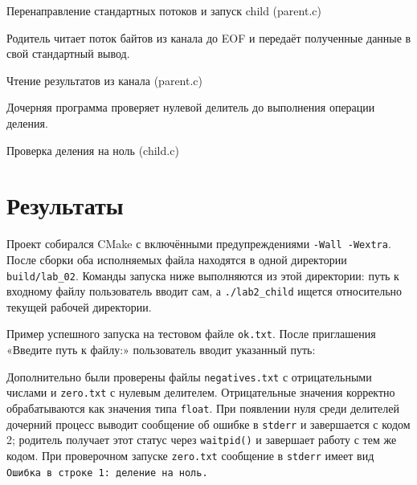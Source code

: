 \documentclass[12pt, a4paper]{article}
\begin{document}
\begin{listingblock}{Перенаправление стандартных потоков и запуск child (parent.c)}
\end{listingblock}

Родитель читает поток байтов из канала до EOF и передаёт полученные данные в свой
стандартный вывод.

\begin{listingblock}{Чтение результатов из канала (parent.c)}
\end{listingblock}

Дочерняя программа проверяет нулевой делитель до выполнения операции деления.

\begin{listingblock}{Проверка деления на ноль (child.c)}
\end{listingblock}

\section{Результаты}

Проект собирался CMake с включёнными предупреждениями \texttt{-Wall -Wextra}.
После сборки оба исполняемых файла находятся в одной директории
\texttt{build/lab\_02}. Команды запуска ниже выполняются из этой директории:
путь к входному файлу пользователь вводит сам, а \texttt{./lab2\_child} ищется
относительно текущей рабочей директории.

Пример успешного запуска на тестовом файле \texttt{ok.txt}. После приглашения
«Введите путь к файлу:» пользователь вводит указанный путь:


Дополнительно были проверены файлы \texttt{negatives.txt} с отрицательными
числами и \texttt{zero.txt} с нулевым делителем. Отрицательные значения
корректно обрабатываются как значения типа
\texttt{float}. При появлении нуля среди делителей дочерний процесс выводит
сообщение об ошибке в \texttt{stderr} и завершается с кодом 2; родитель получает
этот статус через \texttt{waitpid()} и завершает работу с тем же кодом. При
проверочном запуске \texttt{zero.txt} сообщение в \texttt{stderr} имеет вид
\texttt{Ошибка в строке 1: деление на ноль.}
\end{document}
